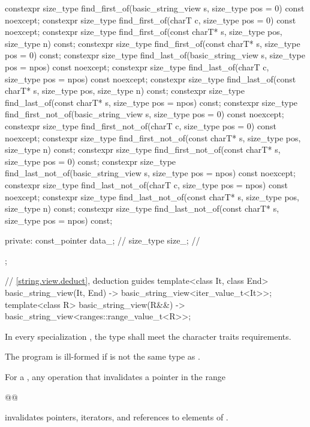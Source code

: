 \begin{codeblock}
{{    constexpr size_type find_first_of(basic_string_view s, size_type pos = 0) const noexcept;
    constexpr size_type find_first_of(charT c, size_type pos = 0) const noexcept;
    constexpr size_type find_first_of(const charT* s, size_type pos, size_type n) const;
    constexpr size_type find_first_of(const charT* s, size_type pos = 0) const;
    constexpr size_type find_last_of(basic_string_view s, size_type pos = npos) const noexcept;
    constexpr size_type find_last_of(charT c, size_type pos = npos) const noexcept;
    constexpr size_type find_last_of(const charT* s, size_type pos, size_type n) const;
    constexpr size_type find_last_of(const charT* s, size_type pos = npos) const;
    constexpr size_type find_first_not_of(basic_string_view s, size_type pos = 0) const noexcept;
    constexpr size_type find_first_not_of(charT c, size_type pos = 0) const noexcept;
    constexpr size_type find_first_not_of(const charT* s, size_type pos,
                                          size_type n) const;
    constexpr size_type find_first_not_of(const charT* s, size_type pos = 0) const;
    constexpr size_type find_last_not_of(basic_string_view s,
                                         size_type pos = npos) const noexcept;
    constexpr size_type find_last_not_of(charT c, size_type pos = npos) const noexcept;
    constexpr size_type find_last_not_of(const charT* s, size_type pos,
                                         size_type n) const;
    constexpr size_type find_last_not_of(const charT* s, size_type pos = npos) const;

  private:
    const_pointer data_;        // \expos
    size_type size_;            // \expos
  };

  // \ref{string.view.deduct}, deduction guides
  template<class It, class End>
    basic_string_view(It, End) -> basic_string_view<iter_value_t<It>>;
  template<class R>
    basic_string_view(R&&) -> basic_string_view<ranges::range_value_t<R>>;
}
\end{codeblock}

\pnum
In every specialization , the type  shall meet the character traits requirements.
\begin{note}
The program is ill-formed if  is not the same type as .
\end{note}

\pnum
For a ,
any operation that invalidates a pointer
in the range
\begin{codeblock}
@@
\end{codeblock}
invalidates pointers, iterators, and references
to elements of .

